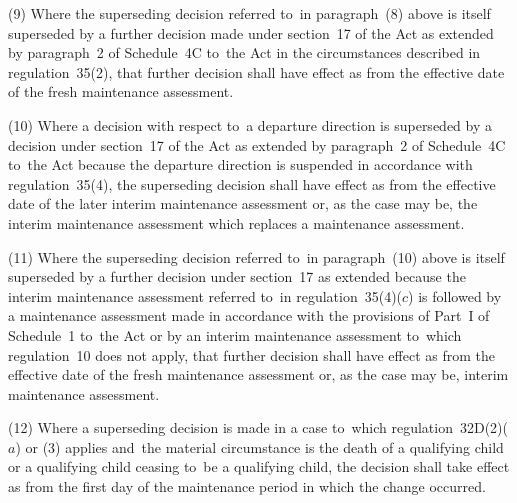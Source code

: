 \documentclass[12pt,a4paper]{article}
\begin{document}
\enlargethispage{\baselineskip}

(9) Where the superseding decision referred to~in paragraph~(8) above is itself superseded by a further decision made under section~17 of the Act as extended by paragraph~2 of Schedule~4C to~the Act in the circumstances described in regulation~35(2), that further decision shall have effect as from the effective date of the fresh maintenance assessment.

(10) Where a decision with respect to~a departure direction is superseded by a decision under section~17 of the Act as extended by paragraph~2 of Schedule~4C to~the Act because the departure direction is suspended in accordance with regulation~35(4), the superseding decision shall have effect as from the effective date of the later interim maintenance assessment or, as the case may be, the interim maintenance assessment which replaces a maintenance assessment.

(11) Where the superseding decision referred to~in paragraph~(10) above is itself superseded by a further decision under section~17 as extended because the interim maintenance assessment referred to~in regulation~35(4)($c$) is followed by a maintenance assessment made in accordance with the provisions of Part~I of Schedule~1 to~the Act or by an interim maintenance assessment to~which regulation~10 does not apply, that further decision shall have effect as from the effective date of the fresh maintenance assessment or, as the case may be, interim maintenance assessment.%

(12) Where a superseding decision is made in a case to~which regulation~32D(2)($a$)  or (3) applies and~the material circumstance is the death of a qualifying child or a qualifying child ceasing to~be a qualifying child, the decision shall take effect as from the first day of the maintenance period in which the change occurred.

\end{document}
